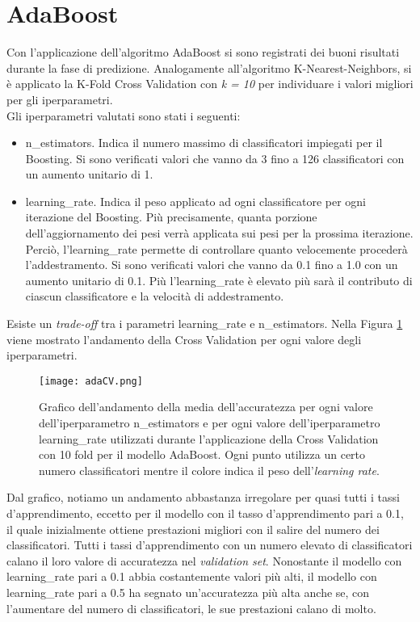 \section{AdaBoost}
Con l'applicazione dell'algoritmo AdaBoost si sono registrati dei buoni risultati durante la fase di predizione. Analogamente all'algoritmo K-Nearest-Neighbors, si è applicato la K-Fold Cross Validation con \emph{k = 10} per individuare i valori migliori per gli iperparametri.\\
Gli iperparametri valutati sono stati i seguenti:
\begin{itemize}
	\item \textsf{n\_estimators}. Indica il numero massimo di classificatori impiegati per il Boosting. Si sono verificati valori che vanno da 3 fino a 126 classificatori con un aumento unitario di 1.
	\item \textsf{learning\_rate}. Indica il peso applicato ad ogni classificatore per ogni iterazione del Boosting. Più precisamente, quanta porzione dell'aggiornamento dei pesi verrà applicata sui pesi per la prossima iterazione. Perciò, l'\textsf{learning\_rate} permette di controllare quanto velocemente procederà l'addestramento. Si sono verificati valori che vanno da 0.1 fino a 1.0 con un aumento unitario di 0.1. Più l'\textsf{learning\_rate} è elevato più sarà il contributo di ciascun classificatore e la velocità di addestramento.
\end{itemize}
Esiste un \emph{trade-off} tra i parametri \textsf{learning\_rate} e \textsf{n\_estimators}. Nella Figura \ref{fig:adaCV} viene mostrato l'andamento della Cross Validation per ogni valore degli iperparametri.
\begin{figure}[h]
	\begin{center}
		\texttt{[image: adaCV.png]}
		\caption{Grafico dell'andamento della media dell'accuratezza per ogni valore dell'iperparametro \textsf{n\_estimators} e per ogni valore dell'iperparametro \textsf{learning\_rate} utilizzati durante l'applicazione della Cross Validation con 10 fold per il modello AdaBoost. Ogni punto utilizza un certo numero classificatori mentre il colore indica il peso dell'\emph{learning rate}.
		} 
		\label{fig:adaCV}
	\end{center}
\end{figure}
Dal grafico, notiamo un andamento abbastanza irregolare per quasi tutti i tassi d'apprendimento, eccetto per il modello con il tasso d'apprendimento pari a 0.1, il quale inizialmente ottiene prestazioni migliori con il salire del numero dei classificatori. Tutti i tassi d'apprendimento con un numero elevato di classificatori calano il loro valore di accuratezza nel \emph{validation set}. Nonostante il modello con \textsf{learning\_rate} pari a 0.1 abbia costantemente valori più alti, il modello con \textsf{learning\_rate} pari a 0.5 ha segnato un'accuratezza più alta anche se, con l'aumentare del numero di classificatori, le sue prestazioni calano di molto. \\
